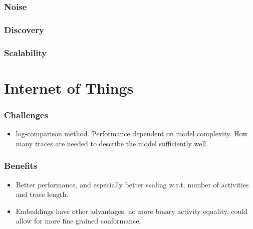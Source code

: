 \documentclass{beamer}
\begin{document}
\begin{frame}
\frametitle{Noise}
\end{frame}


\begin{frame}
	\frametitle{Discovery}
\end{frame}


\begin{frame}
	\frametitle{Scalability}
\end{frame}

\section{Internet of Things}
\begin{frame}
	\frametitle{Challenges}
	\begin{itemize}
		\item log-comparison method. Performance dependent on model complexity. How many traces are needed to describe the model sufficiently well.
	\end{itemize}
\end{frame}

\begin{frame}
	\frametitle{Benefits}
	\begin{itemize}
		\item Better performance, and especially better scaling w.r.t. number of activities and trace length.
		\item Embeddings have other advantages, no more binary activity equality, could allow for more fine grained conformance.
	\end{itemize}
\end{frame}
\end{document}
